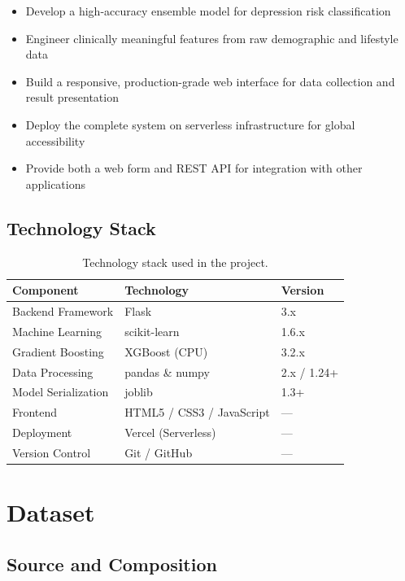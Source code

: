 \documentclass[11pt,a4paper]{article}
\begin{document}
\begin{itemize}[leftmargin=*,nosep]
    \item Develop a high-accuracy ensemble model for depression risk classification
    \item Engineer clinically meaningful features from raw demographic and lifestyle data
    \item Build a responsive, production-grade web interface for data collection and result presentation
    \item Deploy the complete system on serverless infrastructure for global accessibility
    \item Provide both a web form and REST API for integration with other applications
\end{itemize}

\subsection{Technology Stack}

\begin{table}[htbp]
\centering
\begin{tabular}{lll}
\toprule
\textbf{Component} & \textbf{Technology} & \textbf{Version} \\
\midrule
Backend Framework & Flask & 3.x \\
Machine Learning & scikit-learn & 1.6.x \\
Gradient Boosting & XGBoost (CPU) & 3.2.x \\
Data Processing & pandas \& numpy & 2.x / 1.24+ \\
Model Serialization & joblib & 1.3+ \\
Frontend & HTML5 / CSS3 / JavaScript & --- \\
Deployment & Vercel (Serverless) & --- \\
Version Control & Git / GitHub & --- \\
\bottomrule
\end{tabular}
\caption{Technology stack used in the project.}
\end{table}

\section{Dataset}
\label{sec:dataset}

\subsection{Source and Composition}
\end{document}
